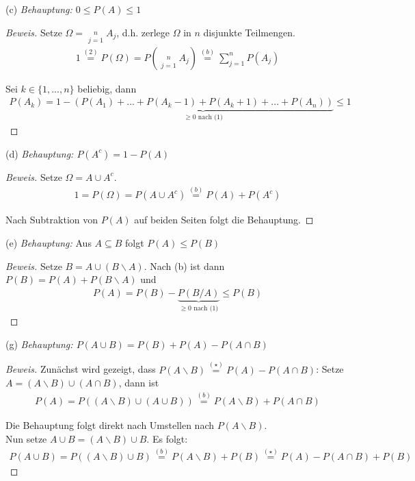 \documentclass[10pt]{article}
\begin{document}
(c) \textit{Behauptung: $0 \leq P(A) \leq 1$}
\begin{proof}[Beweis]
Setze $\Omega = \mathop{\dot\bigcup}\limits_{j=1}^{n} A_j$, d.h. zerlege $\Omega$ in $n$ disjunkte Teilmengen. 
\begin{align*}
    1 \stackrel{(2)}{=} P(\Omega) = P\left( \mathop{\dot\bigcup}\limits_{j=1}^{n} A_j \right) \stackrel{(b)}{=} \sum\limits_{j=1}^{n} P(A_j)
\end{align*}

Sei $k\in\{1,...,n\}$ beliebig, dann
\begin{align*}
    P(A_k) = 1 - \underbrace{(P(A_1) +...+ P(A_k-1) + P(A_k+1) +...+ P(A_n))}_\text{$\geq 0$ nach (1)} \leq 1
\end{align*}

\end{proof}

(d) \textit{Behauptung: $P(A^c) = 1 - P(A)$}
\begin{proof}[Beweis]
Setze $\Omega = A \cup A^c$. 
\begin{align*}
    1 = P(\Omega) = P(A \cup A^c) \stackrel{(b)}{=} P(A) + P(A^c)
\end{align*}

Nach Subtraktion von $P(A)$ auf beiden Seiten folgt die Behauptung.

\end{proof}

(e) \textit{Behauptung: } Aus $A \subseteq B$ folgt $P(A) \leq P(B)$
\begin{proof}[Beweis]
Setze $B = A \cup (B\backslash A)$. Nach (b) ist dann $P(B) = P(A) + P(B\backslash A)$ und 
\begin{align*}
    P(A) = P(B) - \underbrace{P(B/A)}_\text{$\geq 0$ nach (1)} \leq P(B)
\end{align*}

\end{proof}

(g) \textit{Behauptung: $P(A \cup B) = P(B) + P(A) - P(A \cap B)$}
\begin{proof}[Beweis]
Zunächst wird gezeigt, dass $P(A\backslash B) \stackrel{(\star)}{=} P(A) - P(A \cap B)$: Setze $A = (A\backslash B) \cup (A \cap B)$, dann ist 
\begin{align*}
    P(A) = P((A\backslash B)\cup(A \cup B)) \stackrel{(b)}{=} P(A\backslash B) + P(A\cap B)
\end{align*}

Die Behauptung folgt direkt nach Umstellen nach $P(A\backslash B)$. \\
Nun setze $A\cup B = (A\backslash B) \cup B$. Es folgt: 
\begin{align*}
    P(A \cup B) = P((A\backslash B) \cup B) \stackrel{(b)}{=} P(A\backslash B) + P(B) \stackrel{(\star)}{=} P(A) - P(A \cap B) + P(B)
\end{align*}

\end{proof}
\end{document}

